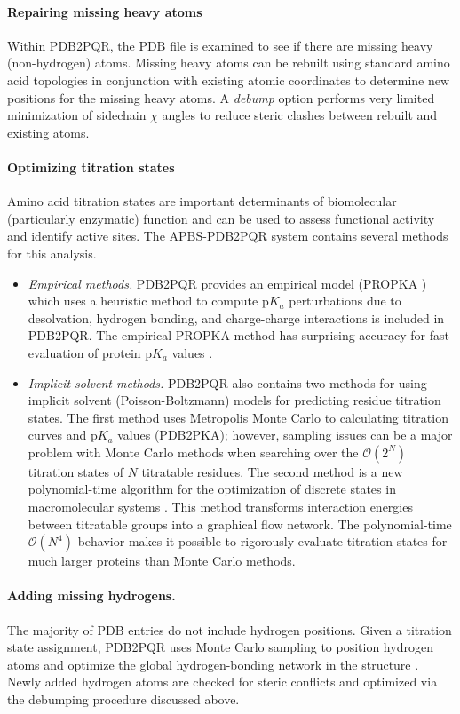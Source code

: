 \documentclass[11pt,titlepage]{article}
\begin{document}
\paragraph{Repairing missing heavy atoms}
Within PDB2PQR, the PDB file is examined to see if there are missing heavy (non-hydrogen) atoms.
Missing heavy atoms can be rebuilt using standard amino acid topologies in conjunction with existing atomic coordinates to determine new positions for the missing heavy atoms.
A \textit{debump} option performs very limited minimization of sidechain $\chi$ angles to reduce steric clashes between rebuilt and existing atoms.

\paragraph{Optimizing titration states}
Amino acid titration states are important determinants of biomolecular (particularly enzymatic) function and can be used to assess functional activity and identify active sites. The APBS-PDB2PQR system contains several methods for this analysis.
\begin{itemize}
	\item \textit{Empirical methods.}
	PDB2PQR provides an empirical model (PROPKA \cite{Sondergaard2011}) which uses a heuristic method to compute p$K_a$ perturbations due to desolvation, hydrogen bonding, and charge-charge interactions is included in PDB2PQR.
	The empirical PROPKA method has surprising accuracy for fast evaluation of protein p$K_a$ values \cite{Li2005}.
	\item \textit{Implicit solvent methods.}
	PDB2PQR also contains two methods for using implicit solvent (Poisson-Boltzmann) models for predicting residue titration states.
	The first method uses Metropolis Monte Carlo to calculating titration curves and p$K_a$ values (PDB2PKA); however, sampling issues can be a major problem with Monte Carlo methods when searching over the $\mathcal{O}\left(2^N\right)$ titration states of $N$ titratable residues.
	The second method is a new polynomial-time algorithm for the optimization of discrete states in macromolecular systems \cite{Purvine2016}.
	This method transforms interaction energies between titratable groups into a graphical flow network.
	The polynomial-time $\mathcal{O}\left(N^4\right)$ behavior makes it possible to rigorously evaluate titration states for much larger proteins than Monte Carlo methods.
\end{itemize}

\paragraph{Adding missing hydrogens.}
The majority of PDB entries do not include hydrogen positions.
Given a titration state assignment, PDB2PQR uses Monte Carlo sampling to position hydrogen atoms and optimize the global hydrogen-bonding network in the structure \cite{Nielsen2001}.
Newly added hydrogen atoms are checked for steric conflicts and optimized via the debumping procedure discussed above.
\end{document}
